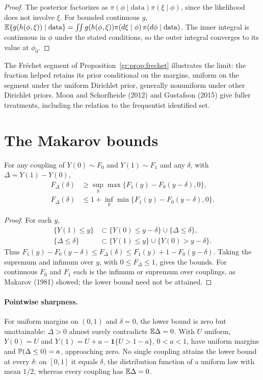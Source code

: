 \begin{proof}
The posterior factorizes as $\pi(\phi \mid \text{data})\pi(\xi \mid \phi)$, since the likelihood does not involve $\xi$. For bounded continuous $g$, $\mathbb{E}\{g(h(\phi, \xi)) \mid \text{data}\} = \int\!\!\int g(h(\phi, \xi))\pi(d\xi \mid \phi)\,\pi(d\phi \mid \text{data})$. The inner integral is continuous in $\phi$ under the stated conditions, so the outer integral converges to its value at $\phi_0$.
\end{proof}

The Fr\'echet segment of Proposition~\ref{gr:prop:frechet} illustrates the limit: the fraction helped retains its prior conditional on the margins, uniform on the segment under the uniform Dirichlet prior, generally nonuniform under other Dirichlet priors. Moon and Schorfheide (2012) and Gustafson (2015) give fuller treatments, including the relation to the frequentist identified set.

\section{The Makarov bounds}

\begin{theorem}
For any coupling of $Y(0) \sim F_0$ and $Y(1) \sim F_1$ and any $\delta$, with $\Delta = Y(1) - Y(0)$,
\begin{align*}
F_\Delta(\delta) &\geq \sup_y\max\{F_1(y) - F_0(y - \delta), 0\},\\
F_\Delta(\delta) &\leq 1 + \inf_y\min\{F_1(y) - F_0(y - \delta), 0\}.
\end{align*}
\end{theorem}

\begin{proof}
For each $y$,
\[
\begin{aligned}
\{Y(1)\le y\}&\subset\{Y(0)\le y-\delta\}\cup\{\Delta\le\delta\},\\
\{\Delta\le\delta\}&\subset\{Y(1)\le y\}\cup\{Y(0)>y-\delta\}.
\end{aligned}
\]
Thus $F_1(y)-F_0(y-\delta)\le F_\Delta(\delta)\le F_1(y)+1-F_0(y-\delta)$. Taking the supremum and infimum over $y$, with $0\le F_\Delta\le1$, gives the bounds. For continuous $F_0$ and $F_1$ each is the infimum or supremum over couplings, as Makarov (1981) showed; the lower bound need not be attained.
\end{proof}

\paragraph{Pointwise sharpness.} For uniform margins on $(0,1)$ and $\delta=0$, the lower bound is zero but unattainable: $\Delta>0$ almost surely contradicts $\mathbb{E}\Delta=0$. With $U$ uniform, $Y(0)=U$ and $Y(1)=U+a-\mathbf1\{U>1-a\}$, $0<a<1$, have uniform margins and $\mathbb{P}(\Delta\le0)=a$, approaching zero. No single coupling attains the lower bound at every $\delta$: on $[0,1]$ it equals $\delta$, the distribution function of a uniform law with mean $1/2$, whereas every coupling has $\mathbb{E}\Delta=0$.

